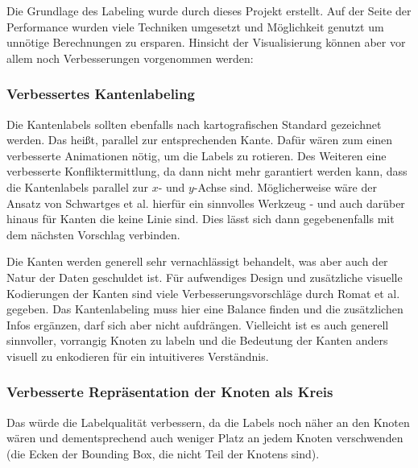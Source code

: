 %
%

Die Grundlage des Labeling wurde durch dieses Projekt erstellt. Auf der Seite der Performance wurden viele Techniken umgesetzt
und Möglichkeit genutzt um unnötige Berechnungen zu ersparen. Hinsicht der Visualisierung können aber vor allem noch Verbesserungen vorgenommen werden:

\subsubsection{Verbessertes Kantenlabeling}
Die Kantenlabels sollten ebenfalls nach kartografischen Standard gezeichnet werden.\cite{cartography} Das heißt, parallel zur entsprechenden Kante.
Dafür wären zum einen verbesserte Animationen nötig, um die Labels zu rotieren. Des Weiteren eine verbesserte Konfliktermittlung,
da dann nicht mehr garantiert werden kann, dass die Kantenlabels parallel zur $x$- und $y$-Achse sind. Möglicherweise wäre der Ansatz von Schwartges et al.\cite{edge_labels} hierfür ein sinnvolles Werkzeug - und auch darüber hinaus für Kanten die keine Linie sind. Dies lässt sich dann gegebenenfalls mit dem nächsten Vorschlag verbinden.

Die Kanten werden generell sehr vernachlässigt behandelt, was aber auch der Natur der Daten geschuldet ist.
Für aufwendiges Design und zusätzliche visuelle Kodierungen der Kanten sind viele Verbesserungsvorschläge durch Romat et al.\cite{edge_improve} gegeben.
Das Kantenlabeling muss hier eine Balance finden und die zusätzlichen Infos ergänzen, darf sich aber nicht aufdrängen.
Vielleicht ist es auch generell sinnvoller, vorrangig Knoten zu labeln und die Bedeutung der Kanten anders visuell zu enkodieren für ein intuitiveres Verständnis.

\subsubsection{Verbesserte Repräsentation der Knoten als Kreis}
Das würde die Labelqualität verbessern, da die Labels noch näher an den Knoten wären und dementsprechend auch weniger Platz an jedem Knoten verschwenden (die Ecken der Bounding Box, die nicht Teil der Knotens sind).

